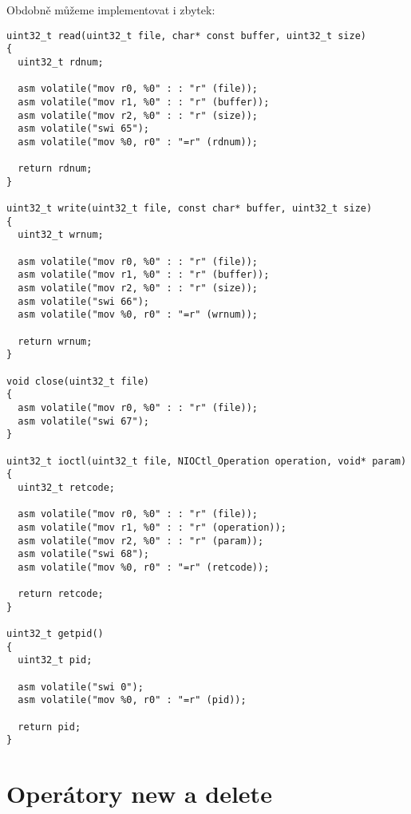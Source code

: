 \documentclass{article}
\begin{document}
Obdobně můžeme implementovat i zbytek:
\begin{lstlisting}
uint32_t read(uint32_t file, char* const buffer, uint32_t size)
{
  uint32_t rdnum;
	
  asm volatile("mov r0, %0" : : "r" (file));
  asm volatile("mov r1, %0" : : "r" (buffer));
  asm volatile("mov r2, %0" : : "r" (size));
  asm volatile("swi 65");
  asm volatile("mov %0, r0" : "=r" (rdnum));
	
  return rdnum;
}

uint32_t write(uint32_t file, const char* buffer, uint32_t size)
{
  uint32_t wrnum;
	
  asm volatile("mov r0, %0" : : "r" (file));
  asm volatile("mov r1, %0" : : "r" (buffer));
  asm volatile("mov r2, %0" : : "r" (size));
  asm volatile("swi 66");
  asm volatile("mov %0, r0" : "=r" (wrnum));
	
  return wrnum;
}

void close(uint32_t file)
{
  asm volatile("mov r0, %0" : : "r" (file));
  asm volatile("swi 67");
}

uint32_t ioctl(uint32_t file, NIOCtl_Operation operation, void* param)
{
  uint32_t retcode;
	
  asm volatile("mov r0, %0" : : "r" (file));
  asm volatile("mov r1, %0" : : "r" (operation));
  asm volatile("mov r2, %0" : : "r" (param));
  asm volatile("swi 68");
  asm volatile("mov %0, r0" : "=r" (retcode));
	
  return retcode;
}

uint32_t getpid()
{
  uint32_t pid;
	
  asm volatile("swi 0");
  asm volatile("mov %0, r0" : "=r" (pid));
	
  return pid;
}
\end{lstlisting}

\section{Operátory new a delete}
\end{document}
